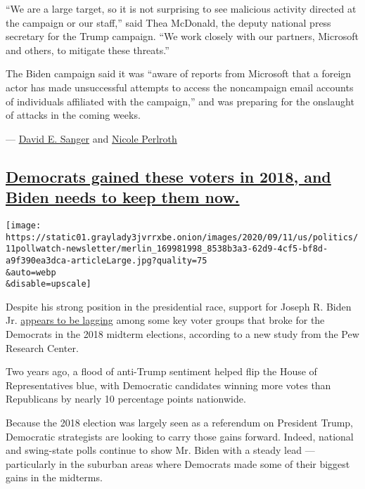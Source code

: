 ``We are a large target, so it is not surprising to see malicious
activity directed at the campaign or our staff,'' said Thea McDonald,
the deputy national press secretary for the Trump campaign. ``We work
closely with our partners, Microsoft and others, to mitigate these
threats.''

The Biden campaign said it was ``aware of reports from Microsoft that a
foreign actor has made unsuccessful attempts to access the noncampaign
email accounts of individuals affiliated with the campaign,'' and was
preparing for the onslaught of attacks in the coming weeks.

--- \href{https://www.nytimes3xbfgragh.onion/by/david-e-sanger}{David E.
Sanger} and
\href{https://www.nytimes3xbfgragh.onion/by/nicole-perlroth}{Nicole
Perlroth}

\hypertarget{democrats-gained-these-voters-in-2018-and-biden-needs-to-keep-them-now}{%
\subsection{\texorpdfstring{\protect\hyperlink{democrats-gained-these-voters-in-2018-and-biden-needs-to-keep-them-now}{Democrats
gained these voters in 2018, and Biden needs to keep them
now.}}{Democrats gained these voters in 2018, and Biden needs to keep them now.}}\label{democrats-gained-these-voters-in-2018-and-biden-needs-to-keep-them-now}}

\texttt{[image: https://static01.graylady3jvrrxbe.onion/images/2020/09/11/us/politics/11pollwatch-newsletter/merlin\_169981998\_8538b3a3-62d9-4cf5-bf8d-a9f390ea3dca-articleLarge.jpg?quality=75\\\&auto=webp\\\&disable=upscale]}

Despite his strong position in the presidential race, support for Joseph
R. Biden Jr.
\href{https://www.nytimes3xbfgragh.onion/2020/09/11/us/politics/joe-biden-polling-trump.html}{appears
to be lagging} among some key voter groups that broke for the Democrats
in the 2018 midterm elections, according to a new study from the Pew
Research Center.

Two years ago, a flood of anti-Trump sentiment helped flip the House of
Representatives blue, with Democratic candidates winning more votes than
Republicans by nearly 10 percentage points nationwide.

Because the 2018 election was largely seen as a referendum on President
Trump, Democratic strategists are looking to carry those gains forward.
Indeed, national and swing-state polls continue to show Mr. Biden with a
steady lead --- particularly in the suburban areas where Democrats made
some of their biggest gains in the midterms.

